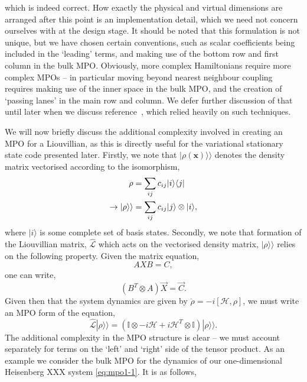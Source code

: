  which is indeed correct. How exactly the physical and virtual dimensions are arranged after this point is an implementation detail, which we need not concern ourselves with at the design stage. It should be noted that this formulation is not unique, but we have chosen certain conventions, such as scalar coefficients being included in the `leading' terms, and making use of the bottom row and first column in the bulk MPO. Obviously, more complex Hamiltonians require more complex MPOs -- in particular moving beyond nearest neighbour coupling requires making use of the inner space in the bulk MPO, and the creation of `passing lanes' in the main row and column. We defer further discussion of that until later when we discuss reference~\cite{Owen2017}, which relied heavily on such techniques.

 We will now briefly discuss the additional complexity involved in creating an MPO for a Liouvillian, as this is directly useful for the variational stationary state code presented later. Firstly, we note that \(|\rho (\mathbf{x}) \rangle \rangle\) denotes the density matrix vectorised according to the isomorphism,
\begin{align}
\rho &= \sum_{ij} c_{ij} |i \rangle \langle j| \notag \\
\rightarrow | \rho \rangle \rangle &= \sum_{ij} c_{ij} |j \rangle \otimes |i \rangle,
\label{eq:vs1-11}
\end{align}
where \(|i\rangle\) is some complete set of basis states. Secondly, we note that formation of the Liouvillian matrix, \(\hat{\mathcal{L}}\) which acts on the vectorised density matrix, \(|\rho \rangle \rangle\) relies on the following property. Given the matrix equation,
 \begin{equation}
 	AXB = C,
 	\label{eq:mpo1-6}
 \end{equation}
 one can write,
 \begin{equation}
 	(B^{T} \otimes A)\vec{X} = \vec{C}.
 	\label{eq:mpo1-7}
 \end{equation}
 Given then that the system dynamics are given by \(\dot{\rho} = -i[\mathcal{H}, \rho]\), we must write an MPO form of the equation,
 \begin{equation}
 	\hat{\mathcal{L}}|\rho \rangle \rangle = \left( \mathbb{I} \otimes -i\mathcal{H} + i\mathcal{H}^{T} \otimes \mathbb{I} \right)| \rho \rangle \rangle.
 	\label{eq:mpo1-8}
 \end{equation}
 The additional complexity in the MPO structure is clear -- we must account separately for terms on the `left' and `right' side of the tensor product. As an example we consider the bulk MPO for the dynamics of our one-dimensional Heisenberg XXX system \cref{eq:mpo1-1}. It is as follows,
